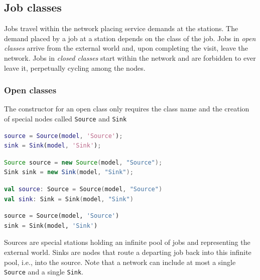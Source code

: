 \subsection{Job classes}
Jobs travel within the network placing service demands at the stations. The demand placed by a job at a station depends on the class of the job. Jobs in {\em open classes} arrive from the external world and, upon completing the visit, leave the network. Jobs in {\em closed classes} start within the network and are forbidden to ever leave it, perpetually cycling among the nodes.

\subsubsection{Open classes}
The constructor for an open class only requires the class name and the creation of special nodes called \texttt{Source} and \texttt{Sink}
\begin{MATLAB}
\begin{lstlisting}[language = matlab]
source = Source(model, 'Source');
sink = Sink(model, 'Sink');
\end{lstlisting}
\end{MATLAB}
\begin{JAVA}
\begin{lstlisting}[language = java, basicstyle=\ttfamily\scriptsize]
Source source = new Source(model, "Source");
Sink sink = new Sink(model, "Sink");
\end{lstlisting}
\end{JAVA}
\begin{KOTLIN}
\begin{lstlisting}[language = kotlin, basicstyle=\ttfamily\scriptsize]
val source: Source = Source(model, "Source")
val sink: Sink = Sink(model, "Sink")
\end{lstlisting}
\end{KOTLIN}
\begin{PYTHON}
\begin{lstlisting}[language = python]
source = Source(model, 'Source')
sink = Sink(model, 'Sink')
\end{lstlisting}
\end{PYTHON}
Sources are special stations holding an infinite pool of jobs and representing the external world. Sinks are nodes that route a departing job back into this infinite pool, i.e., into the source. Note that a network can include at most a single \texttt{Source} and a single \texttt{Sink}.

